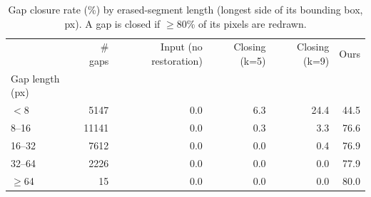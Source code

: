 \begin{table}
\caption{Gap closure rate (\%) by erased-segment length (longest side of its bounding box, px). A gap is closed if $\geq$80\% of its pixels are redrawn.}
\label{tab:gap_length}
\begin{tabular}{lrrrrr}
\toprule
 & \# gaps & Input (no restoration) & Closing (k=5) & Closing (k=9) & Ours \\
Gap length (px) &  &  &  &  &  \\
\midrule
$<$8 & 5147 & 0.0 & 6.3 & 24.4 & 44.5 \\
8--16 & 11141 & 0.0 & 0.3 & 3.3 & 76.6 \\
16--32 & 7612 & 0.0 & 0.0 & 0.4 & 76.9 \\
32--64 & 2226 & 0.0 & 0.0 & 0.0 & 77.9 \\
$\geq$64 & 15 & 0.0 & 0.0 & 0.0 & 80.0 \\
\bottomrule
\end{tabular}
\end{table}
